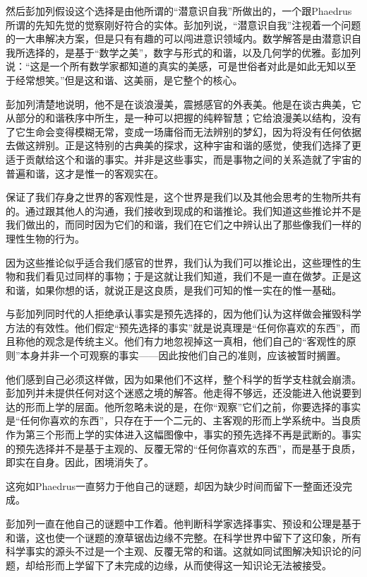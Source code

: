\documentclass[UTF8]{article}
\begin{document}
\par 然后彭加列假设这个选择是由他所谓的“潜意识自我”所做出的，一个跟Phaedrus所谓的先知先觉的觉察刚好符合的实体。彭加列说，“潜意识自我”注视着一个问题的一大串解决方案，但是只有有趣的可以闯进意识领域内。数学解答是由潜意识自我所选择的，是基于“数学之美”，数字与形式的和谐，以及几何学的优雅。彭加列说：“这是一个所有数学家都知道的真实的美感，可是世俗者对此是如此无知以至于经常想笑。”但是这和谐、这美丽，是它整个的核心。
\par 彭加列清楚地说明，他不是在谈浪漫美，震撼感官的外表美。他是在谈古典美，它从部分的和谐秩序中所生，是一种可以把握的纯粹智慧；它给浪漫美以结构，没有了它生命会变得模糊无常，变成一场庸俗而无法辨别的梦幻，因为将没有任何依据去做这辨别。正是这特别的古典美的探求，这种宇宙和谐的感觉，使我们选择了更适于贡献给这个和谐的事实。并非是这些事实，而是事物之间的关系造就了宇宙的普遍和谐，这才是惟一的客观实在。
\par 保证了我们存身之世界的客观性是，这个世界是我们以及其他会思考的生物所共有的。通过跟其他人的沟通，我们接收到现成的和谐推论。我们知道这些推论并不是我们做出的，而同时因为它们的和谐，我们在它们之中辨认出了那些像我们一样的理性生物的行为。
\par 因为这些推论似乎适合我们感官的世界，我们认为我们可以推论出，这些理性的生物和我们看见过同样的事物；于是这就让我们知道，我们不是一直在做梦。正是这和谐，如果你想的话，就说正是这良质，是我们可知的惟一实在的惟一基础。
\par 与彭加列同时代的人拒绝承认事实是预先选择的，因为他们认为这样做会摧毁科学方法的有效性。他们假定“预先选择的事实”就是说真理是“任何你喜欢的东西”，而且称他的观念是传统主义。他们有力地忽视掉这一真相，他们自己的“客观性的原则”本身并非一个可观察的事实——因此按他们自己的准则，应该被暂时搁置。
\par 他们感到自己必须这样做，因为如果他们不这样，整个科学的哲学支柱就会崩溃。彭加列并未提供任何对这个迷惑之境的解答。他走得不够远，还没能进入他说要到达的形而上学的层面。他所忽略未说的是，在你“观察”它们之前，你要选择的事实是“任何你喜欢的东西”，只存在于一个二元的、主客观的形而上学系统中。当良质作为第三个形而上学的实体进入这幅图像中，事实的预先选择不再是武断的。事实的预先选择并不是基于主观的、反覆无常的“任何你喜欢的东西”，而是基于良质，即实在自身。因此，困境消失了。
\par 这宛如Phaedrus一直努力于他自己的谜题，却因为缺少时间而留下一整面还没完成。
\par 彭加列一直在他自己的谜题中工作着。他判断科学家选择事实、预设和公理是基于和谐，这也使一个谜题的潦草锯齿边缘不完整。在科学世界中留下了这印象，所有科学事实的源头不过是一个主观、反覆无常的和谐。这就如同试图解决知识论的问题，却给形而上学留下了未完成的边缘，从而使得这一知识论无法被接受。
\end{document}
